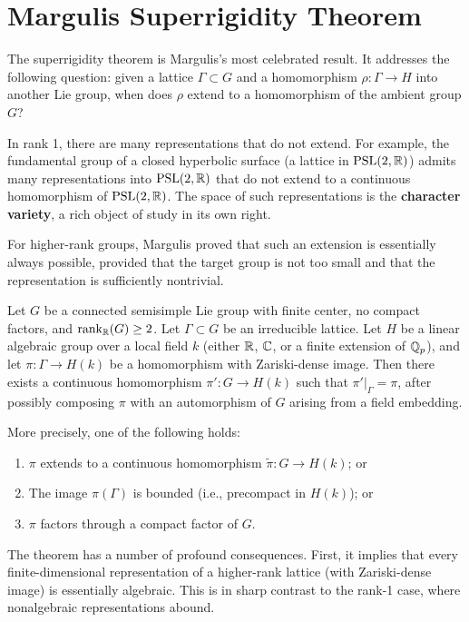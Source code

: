 \section{Margulis Superrigidity Theorem}

The superrigidity theorem is Margulis's most celebrated result. It addresses the following question: given a lattice \(\Gamma \subset G\) and a homomorphism \(\rho: \Gamma \to H\) into another Lie group, when does \(\rho\) extend to a homomorphism of the ambient group \(G\)?

In rank 1, there are many representations that do not extend. For example, the fundamental group of a closed hyperbolic surface (a lattice in \(\operatorname{PSL}(2,\mathbb{R})\)) admits many representations into \(\operatorname{PSL}(2,\mathbb{R})\) that do not extend to a continuous homomorphism of \(\operatorname{PSL}(2,\mathbb{R})\). The space of such representations is the \textbf{character variety}, a rich object of study in its own right.

For higher-rank groups, Margulis proved that such an extension is essentially always possible, provided that the target group is not too small and that the representation is sufficiently nontrivial.

\begin{theorem}
Let \(G\) be a connected semisimple Lie group with finite center, no compact factors, and \(\rank_{\mathbb{R}}(G) \geq 2\). Let \(\Gamma \subset G\) be an irreducible lattice. Let \(H\) be a linear algebraic group over a local field \(k\) (either \(\mathbb{R}\), \(\mathbb{C}\), or a finite extension of \(\mathbb{Q}_p\)), and let \(\pi: \Gamma \to H(k)\) be a homomorphism with Zariski-dense image. Then there exists a continuous homomorphism \(\pi': G \to H(k)\) such that \(\pi'|_{\Gamma} = \pi\), after possibly composing \(\pi\) with an automorphism of \(G\) arising from a field embedding.

More precisely, one of the following holds:
\begin{enumerate}
    \item \(\pi\) extends to a continuous homomorphism \(\widetilde{\pi}: G \to H(k)\); or
    \item The image \(\pi(\Gamma)\) is bounded (i.e., precompact in \(H(k)\)); or
    \item \(\pi\) factors through a compact factor of \(G\).
\end{enumerate}
\end{theorem}

The theorem has a number of profound consequences. First, it implies that every finite-dimensional representation of a higher-rank lattice (with Zariski-dense image) is essentially algebraic. This is in sharp contrast to the rank-1 case, where nonalgebraic representations abound.

